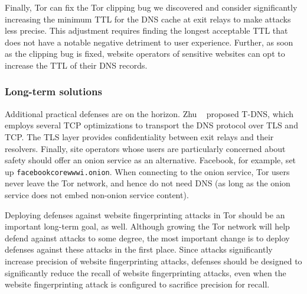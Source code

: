 \iffalse
In addition to making recommendations to exit relay operators, we can remotely
influence the cache of each exit relay's resolver.  For example, using {\tt
exitmap}, we can continuously resolve potentially sensitive domains over each
exit relay, right before its TTL is about to expire.  In such a setup, an
attacker gains no advantage from observing DNS traffic from the exit relays
because the domain is always in every exit relay's resolver cache.  This
approach scales poorly, considering the potentially large number of domain names
that would need to be cached (recall that the long tail of unpopular sites are
most vulnerable to \name attacks), but it allows us to eliminate DNS-based
correlation attacks for a select number of sites.
\fi

Finally, Tor can fix the Tor clipping bug we discovered and consider
significantly increasing the minimum TTL for the DNS cache at exit relays to
make \name attacks less precise.  This adjustment requires finding the longest
acceptable TTL that does not have a notable negative detriment to user
experience.  Further, as soon as the clipping bug is fixed, website operators
of sensitive websites can opt to increase the TTL of their DNS records.

\subsubsection{Long-term solutions}
\label{sec:long-term}

Additional practical defenses are on the horizon.  Zhu \ea~\cite{Zhu2015a}
proposed T-DNS, which employs several TCP optimizations to transport the DNS
protocol over TLS and TCP.  The TLS layer provides confidentiality between exit
relays and their resolvers.  Finally, site operators whose users are
particularly concerned about safety should offer an onion service as an
alternative.  Facebook, for example, set up {\tt facebookcorewwwi.onion}.  When
connecting to the onion service, Tor users never leave the Tor network, and
hence do not need DNS (as long as the onion service does not embed non-onion
service content).

Deploying defenses against website fingerprinting attacks in Tor should be an
important long-term goal, as well.
Although growing the Tor network will help defend against \name attacks to some
degree, the most important change is to
deploy defenses against these attacks in the first place.  Since \name attacks
significantly increase precision of website fingerprinting attacks, defenses
should be designed to significantly reduce the recall of website fingerprinting
attacks, even when the website fingerprinting attack is configured to sacrifice
precision for recall.
